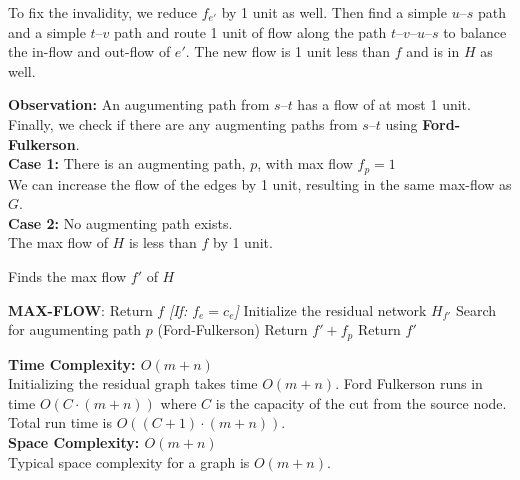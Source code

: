 \documentclass[11pt]{article}
\theoremstyle{definition}
\theoremstyle{plain}
\theoremstyle{indented-remark}
\theoremstyle{indented-proof}
\begin{document}
\noindent To fix the invalidity, we reduce $f_{e'}$ by 1 unit as well. Then find a simple $u$--$s$ path and a simple $t$--$v$ path and route 1 unit of flow along the path $t$--$v$--$u$--$s$ to balance the in-flow and out-flow of $e'$. The new flow  is 1 unit less than $f$ and is in $H$ as well.

\noindent \textbf{Observation:} An augumenting path from $s$--$t$ has a flow of at most 1 unit. \\

\noindent Finally, we check if there are any augmenting paths from $s$--$t$ using \textbf{Ford-Fulkerson}.\\

\textbf{Case 1:} There is an augmenting path, $p$, with max flow $f_{p} = 1$ \\

\indent \indent We can increase the flow of the edges by 1 unit, resulting in the same max-flow as $G$. \\

\textbf{Case 2:} No augmenting path exists. \\

\indent \indent The max flow of $H$ is less than $f$ by 1 unit. \\

\pagebreak

\begin{algorithm}
\caption{Finds the max flow $f'$ of $H$}
\begin{algorithmic} 
\STATE \textbf{MAX-FLOW}:
\STATE Return $f$
\ELSE
\STATE \textit{[If: $f_{e} = c_{e}$]}
\STATE Initialize the residual network $H_{f'}$
\STATE Search for augumenting path $p$ (Ford-Fulkerson)
\STATE Return $f'+f_{p}$
\ELSE
\STATE Return $f'$
\ENDIF
\ENDIF
\end{algorithmic}
\end{algorithm}

\noindent \textbf{Time Complexity: $O(m+n)$} \\
\noindent Initializing the residual graph takes time $O(m+n)$. Ford Fulkerson runs in time $O(C \cdot (m+n))$ where $C$ is the capacity of the cut from the source node. Total run time is $O((C+1) \cdot (m+n))$. \\

\noindent \textbf{Space Complexity: $O(m+n)$} \\
\noindent Typical space complexity for a graph is $O(m+n)$. 
\end{document}
